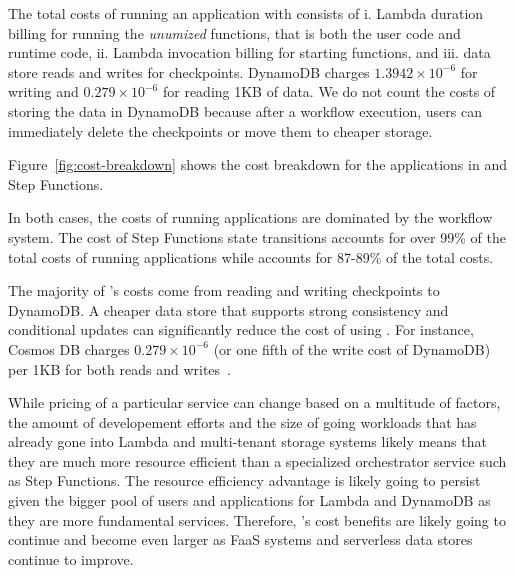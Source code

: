 The total costs of running an application with \name{} consists of i. Lambda
duration billing for running the \emph{unumized} functions, that is both the
user code and \name{} runtime code, ii. Lambda invocation billing for starting
functions, and iii. data store reads and writes for checkpoints. DynamoDB
charges $1.3942 \times 10^{-6}$ for writing and $0.279
\times 10^{-6}$ for reading 1KB of data. We do not count the costs of storing
the data in DynamoDB because after a workflow execution, users can immediately
delete the checkpoints or move them to cheaper storage.

Figure~\ref{fig:cost-breakdown} shows the cost breakdown for the applications
in \name{} and Step Functions.


In both cases, the costs of running applications are dominated by the workflow
system. The cost of Step Functions state transitions accounts for over 99\% of
the total costs of running applications while \name{} accounts for 87-89\% of
the total costs.

The majority of \name{}'s costs come from reading and writing checkpoints to
DynamoDB. A cheaper data store that supports strong consistency and
conditional updates can significantly reduce the cost of using \name{}. For
instance, Cosmos DB charges $0.279 \times 10^{-6}$ (or one fifth of the write
cost of DynamoDB) per 1KB for both reads and writes~\cite{cosmosdb-pricing}.

While pricing of a particular service can change based on a multitude of
factors, the amount of developement efforts and the size of going workloads
that has already gone into Lambda and multi-tenant storage systems likely
means that they are much more resource efficient than a specialized
orchestrator service such as Step Functions. The resource efficiency advantage
is likely going to persist given the bigger pool of users and applications for
Lambda and DynamoDB as they are more fundamental services. Therefore,
\name{}'s cost benefits are likely going to continue and become even larger as
FaaS systems and serverless data stores continue to improve.





